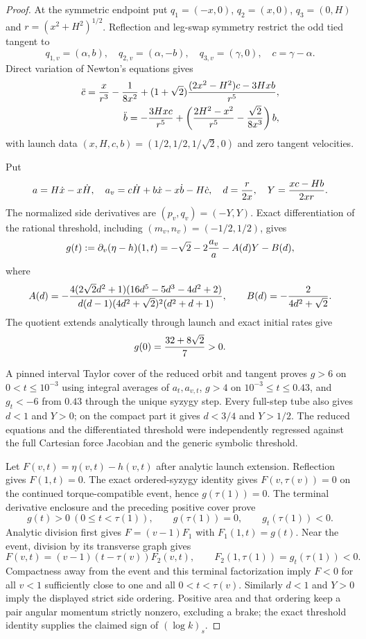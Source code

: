 \documentclass[11pt]{article}
\begin{document}
\begin{proof}
At the symmetric endpoint put
$q_1=(-x,0)$, $q_2=(x,0)$, $q_3=(0,H)$ and
$r=(x^2+H^2)^{1/2}$.  Reflection and leg-swap symmetry restrict the odd tied
tangent to
\[
 q_{1,v}=(\alpha,b),\quad q_{2,v}=(\alpha,-b),\quad
 q_{3,v}=(\gamma,0),\quad c=\gamma-\alpha.
\]
Direct variation of Newton's equations gives
\[
\begin{aligned}
 \ddot c={x\over r^3}-{1\over8x^2}
  +(1+\sqrt2){(2x^2-H^2)c-3Hxb\over r^5},\\
 \ddot b=-{3Hxc\over r^5}
  +\left({2H^2-x^2\over r^5}-{\sqrt2\over8x^3}\right)b,
\end{aligned}
\]
with launch data
$(x,H,c,b)=(1/2,1/2,1/\sqrt2,0)$ and zero tangent velocities.

Put
\[
 a=H\dot x-x\dot H,\quad
 a_v=c\dot H+b\dot x-x\dot b-H\dot c,\quad
 d={r\over2x},\quad Y={xc-Hb\over2xr}.
\]
The normalized side derivatives are $(p_v,q_v)=(-Y,Y)$.  Exact
differentiation of the rational threshold, including
$(m_v,n_v)=(-1/2,1/2)$, gives
\[
 g(t):=\partial_v(\eta-h)(1,t)
 =-\sqrt2-2{a_v\over a}-A(d)Y-B(d),
\]
where
\[
 A(d)=-{4(2\sqrt2d^2+1)(16d^5-5d^3-4d^2+2)
 \over d(d-1)(4d^2+\sqrt2)^2(d^2+d+1)},\qquad
 B(d)=-{2\over4d^2+\sqrt2}.
\]
The quotient extends analytically through launch and exact initial rates give
\[
 g(0)={32+8\sqrt2\over7}>0.
\]

A pinned interval Taylor cover of the reduced orbit and tangent proves
$g>6$ on $0<t\le10^{-3}$ using integral averages of $a_t,a_{v,t}$,
$g>4$ on $10^{-3}\le t\le0.43$, and $g_t<-6$ from $0.43$ through the
unique syzygy step.  Every full-step tube also gives $d<1$ and $Y>0$; on
the compact part it gives $d<3/4$ and $Y>1/2$.  The reduced equations and
the differentiated threshold were independently regressed against the full
Cartesian force Jacobian and the generic symbolic threshold.

Let $F(v,t)=\eta(v,t)-h(v,t)$ after analytic launch extension.  Reflection
gives $F(1,t)=0$.  The exact ordered-syzygy identity gives
$F(v,\tau(v))=0$ on the continued torque-compatible event, hence
$g(\tau(1))=0$.  The terminal derivative enclosure and the preceding
positive cover prove
\[
 g(t)>0\ (0\le t<\tau(1)),\qquad
 g(\tau(1))=0,\qquad g_t(\tau(1))<0.
\]
Analytic division first gives $F=(v-1)F_1$ with $F_1(1,t)=g(t)$.
Near the event, division by its transverse graph gives
\[
 F(v,t)=(v-1)(t-\tau(v))F_2(v,t),\qquad
 F_2(1,\tau(1))=g_t(\tau(1))<0.
\]
Compactness away from the event and this terminal factorization imply
$F<0$ for all $v<1$ sufficiently close to one and all
$0<t<\tau(v)$.  Similarly $d<1$ and $Y>0$ imply the displayed strict side
ordering.  Positive area and that ordering keep a pair angular momentum
strictly nonzero, excluding a brake; the exact threshold identity supplies
the claimed sign of $(\log k)_s$.
\end{proof}
\end{document}
